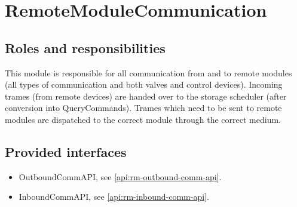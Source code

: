 \section{RemoteModuleCommunication}
\label{element:rm-comm-unit}

\subsection{Roles and responsibilities}

\npar This module is responsible for all communication from and to remote
modules (all types of communication and both valves and control devices).
Incoming trames (from remote devices) are handed over to the storage scheduler
(after conversion into QueryCommands). Trames which need to be sent to remote
modules are dispatched to the correct module through the correct medium.

\subsection{Provided interfaces}

\begin{itemize}
  \item OutboundCommAPI, see \ref{api:rm-outbound-comm-api}.
  \item InboundCommAPI, see \ref{api:rm-inbound-comm-api}.
\end{itemize}



